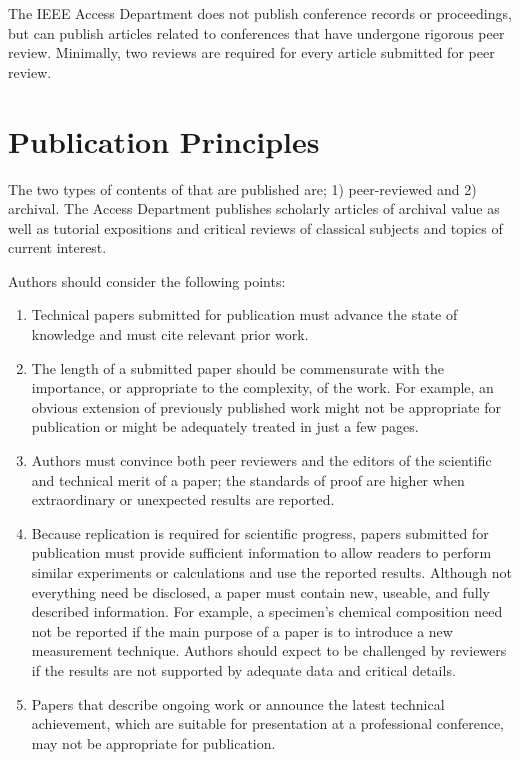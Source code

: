 \documentclass{ieeeaccess}
\begin{document}
The IEEE Access Department does not publish conference 
records or proceedings, but can publish articles related to conferences that 
have undergone rigorous peer review. Minimally, two reviews are required for 
every article submitted for peer review.

\section{Publication Principles}
The two types of contents of that are published are; 1) peer-reviewed and 2) 
archival. The Access Department publishes scholarly 
articles of archival value as well as tutorial expositions and critical 
reviews of classical subjects and topics of current interest. 

Authors should consider the following points:

\begin{enumerate}
\item Technical papers submitted for publication must advance the state of knowledge and must cite relevant prior work. 
\item The length of a submitted paper should be commensurate with the importance, or appropriate to the complexity, of the work. For example, an obvious extension of previously published work might not be appropriate for publication or might be adequately treated in just a few pages.
\item Authors must convince both peer reviewers and the editors of the scientific and technical merit of a paper; the standards of proof are higher when extraordinary or unexpected results are reported. 
\item Because replication is required for scientific progress, papers submitted for publication must provide sufficient information to allow readers to perform similar experiments or calculations and 
use the reported results. Although not everything need be disclosed, a paper 
must contain new, useable, and fully described information. For example, a 
specimen's chemical composition need not be reported if the main purpose of 
a paper is to introduce a new measurement technique. Authors should expect 
to be challenged by reviewers if the results are not supported by adequate 
data and critical details.
\item Papers that describe ongoing work or announce the latest technical achievement, which are suitable for presentation at a professional conference, may not be appropriate for publication.
\end{enumerate}
\end{document}
